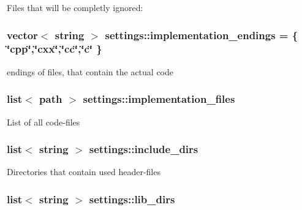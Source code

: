 Files that will be completly ignored\-: \hypertarget{structsettings_af86d24c31f2f22f2d4bb588b901b06f7}{
\subsubsection[{implementation\-\_\-endings}]{\setlength{\rightskip}{0pt plus 5cm}vector$<$ string $>$ settings\-::implementation\-\_\-endings = \{ \char`\"{}cpp\char`\"{},\char`\"{}cxx\char`\"{},\char`\"{}cc\char`\"{},\char`\"{}c\char`\"{} \}\hspace{0.3cm}{\ttfamily [static]}}}\label{structsettings_af86d24c31f2f22f2d4bb588b901b06f7}
endings of files, that contain the actual code \hypertarget{structsettings_aca3dbe12e7356fd1470e358838053b11}{
\subsubsection[{implementation\-\_\-files}]{\setlength{\rightskip}{0pt plus 5cm}list$<$ path $>$ settings\-::implementation\-\_\-files\hspace{0.3cm}{\ttfamily [static]}}}\label{structsettings_aca3dbe12e7356fd1470e358838053b11}
List of all code-\/files \hypertarget{structsettings_a08e64a4b8389d43ddb5ac80a9c38b972}{
\subsubsection[{include\-\_\-dirs}]{\setlength{\rightskip}{0pt plus 5cm}list$<$ string $>$ settings\-::include\-\_\-dirs\hspace{0.3cm}{\ttfamily [static]}}}\label{structsettings_a08e64a4b8389d43ddb5ac80a9c38b972}
Directories that contain used header-\/files \hypertarget{structsettings_ad610e1e631ff18ec593a47b6c73e6a4f}{
\subsubsection[{lib\-\_\-dirs}]{\setlength{\rightskip}{0pt plus 5cm}list$<$ string $>$ settings\-::lib\-\_\-dirs\hspace{0.3cm}{\ttfamily [static]}}}\label{structsettings_ad610e1e631ff18ec593a47b6c73e6a4f}
